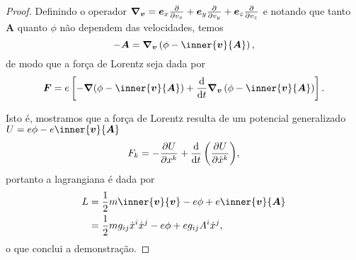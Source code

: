 \documentclass[12pt,a4paper]{article}
\newcommand\vetor[1]{\ensuremath{\boldsymbol{#1}}}
\begin{document}
\begin{proof}
    Definindo o operador \(\vetor{\nabla}_{\vetor{v}} = \vetor{e}_x\diffp*{}{v_x} + \vetor{e}_y\diffp*{}{v_y} + \vetor{e}_z\diffp*{}{v_z}\) e notando que tanto \(\vetor{A}\) quanto \(\phi\) não dependem das velocidades, temos
    \begin{equation*}
        -\vetor{A} = \vetor{\nabla}_{\vetor{v}}\left(\phi - \inner{\vetor{v}}{\vetor{A}}\right),
    \end{equation*}
    de modo que a força de Lorentz seja dada por
    \begin{equation*}
        \vetor{F} = e \left[- \vetor{\nabla}(\phi - \inner{\vetor{v}}{\vetor{A}}) + \diff*{\vetor{\nabla}_{\vetor{v}}\left(\phi - \inner{\vetor{v}}{\vetor{A}}\right)}{t}\right].
    \end{equation*}

    Isto é, mostramos que a força de Lorentz resulta de um potencial generalizado \(U = e\phi - e\inner{\vetor{v}}{\vetor{A}}\)
    \begin{equation*}
        F_k = - \diffp{U}{x^k} + \diff*{\left(\diffp{U}{\dot{x}^k}\right)}{t},
    \end{equation*}
    portanto a lagrangiana é dada por
    \begin{align*}
        L &= \frac12 m\inner{\vetor{v}}{\vetor{v}} - e\phi + e\inner{\vetor{v}}{\vetor{A}}\\
          &= \frac12 mg_{ij} \dot{x}^i \dot{x}^j - e\phi + eg_{ij}A^i\dot{x}^j,
    \end{align*}
    o que conclui a demonstração.
\end{proof}




% 
% 
% 
\end{document}
